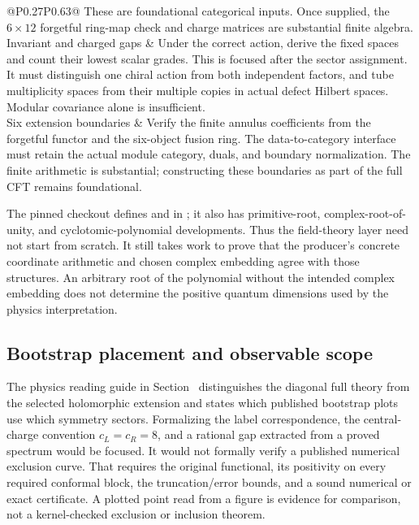 \begin{longtable}{@{}P{0.27\linewidth}P{0.63\linewidth}@{}}
These are foundational categorical inputs. Once supplied, the
$6\times12$ forgetful ring-map check and charge matrices are
substantial finite algebra.\\
Invariant and charged gaps
& Under the correct action, derive the fixed spaces and count their
lowest scalar grades. This is focused after the sector assignment.
It must distinguish one chiral action from both independent factors,
and tube multiplicity spaces from their multiple copies in actual
defect Hilbert spaces. Modular covariance alone is insufficient.\\
Six extension boundaries
& Verify the finite annulus coefficients from the forgetful functor
and the six-object fusion ring. The data-to-category interface must
retain the actual module category, duals, and boundary normalization.
The finite arithmetic is substantial; constructing these boundaries
as part of the full CFT remains foundational.\\
\end{longtable}

The pinned checkout defines  and
 in
; it also has
primitive-root, complex-root-of-unity, and cyclotomic-polynomial
developments. Thus the field-theory layer need not start from scratch.
It still takes work to prove that the producer's concrete coordinate
arithmetic and chosen complex embedding agree with those structures.
An arbitrary root of the polynomial without the intended complex
embedding does not determine the positive quantum dimensions used
by the physics interpretation.

\subsection{Bootstrap placement and observable scope}

The physics reading guide in Section~
distinguishes the diagonal full theory from
the selected holomorphic extension and states which published bootstrap
plots use which symmetry sectors. Formalizing the label correspondence,
the central-charge convention $c_L=c_R=8$, and a rational gap extracted
from a proved spectrum would be focused. It would not formally verify
a published numerical exclusion curve. That requires the original
functional, its positivity on every required conformal block, the
truncation/error bounds, and a sound numerical or exact certificate.
A plotted point read from a figure is evidence for comparison, not a
kernel-checked exclusion or inclusion theorem.

